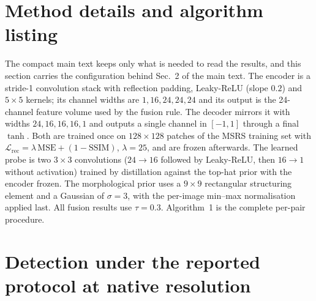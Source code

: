 \documentclass[preprint,12pt,a4paper]{elsarticle}
\begin{document}
\section{Method details and algorithm listing}
\label{sec:lmethod}

The compact main text keeps only what is needed to read the results, and this section
carries the configuration behind Sec.~2 of the main text. The encoder is a stride-1
convolution stack with reflection padding, Leaky-ReLU (slope $0.2$) and $5\times5$
kernels; its channel widths are $1,16,24,24,24$ and its output is the 24-channel
feature volume used by the fusion rule. The decoder mirrors it with widths
$24,16,16,16,1$ and outputs a single channel in $[-1,1]$ through a final $\tanh$. Both
are trained once on $128\times128$ patches of the MSRS training set with
$\mathcal{L}_{\mathrm{rec}}=\lambda\,\mathrm{MSE}+(1-\mathrm{SSIM})$, $\lambda=25$, and
are frozen afterwards. The learned probe is two $3\times3$ convolutions
($24\rightarrow16$ followed by Leaky-ReLU, then $16\rightarrow1$ without activation)
trained by distillation against the top-hat prior with the encoder frozen. The
morphological prior uses a $9\times9$ rectangular structuring element and a Gaussian of
$\sigma=3$, with the per-image min--max normalisation applied last. All fusion results
use $\tau=0.3$. Algorithm~1 is the complete per-pair procedure.

\begin{center}
\end{center}

\section{Detection under the reported protocol at native resolution}
\label{sec:lnative}
\end{document}
